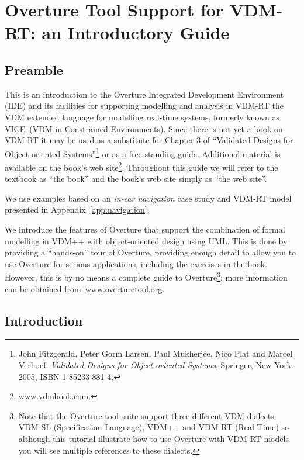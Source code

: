 \chapter{Overture Tool Support for VDM-RT: an Introductory Guide}\label{cha:toolbox}
\initexercise

\section*{Preamble}

This is an introduction to the Overture Integrated Development
Environment (IDE) and its facilities for supporting modelling and
analysis in VDM-RT the VDM extended language for modelling real-time
systems, formerly known as VICE~(VDM in Constrained Environments). 
Since there is not yet a book on VDM-RT it
may be used as a substitute for Chapter 3 of ``Validated Designs for
Object-oriented Systems''\footnote{John Fitzgerald, Peter Gorm Larsen,
  Paul Mukherjee, Nico Plat and Marcel Verhoef. \emph{Validated
    Designs for Object-oriented Systems}, Springer, New York. 2005,
  ISBN 1-85233-881-4.} or as a free-standing guide. Additional material
is available on the book's web
site\footnote{\url{www.vdmbook.com}.}. Throughout this guide we will refer to
the textbook as ``the book'' and the book's web site simply as ``the
web site''.

We use examples based on an \emph{in-car navigation} case study and
VDM-RT model presented in Appendix~\ref{app:navigation}. 

We introduce the features of Overture that support the combination of
formal modelling in VDM++ with object-oriented design using UML. This
is done by providing a ``hands-on'' tour of Overture, providing enough
detail to allow you to use Overture for serious applications,
including the exercises in the book. However, this is by no means a
complete guide to Overture\footnote{Note that the Overture tool suite support three
  different VDM dialects; VDM-SL (Specification Language), VDM++ and
  VDM-RT (Real Time) so although this tutorial illustrate how to use
  Overture with VDM-RT models you will see multiple references to
  these dialects.}; more information can be obtained
from~\url{www.overturetool.org}.



\section{Introduction}

